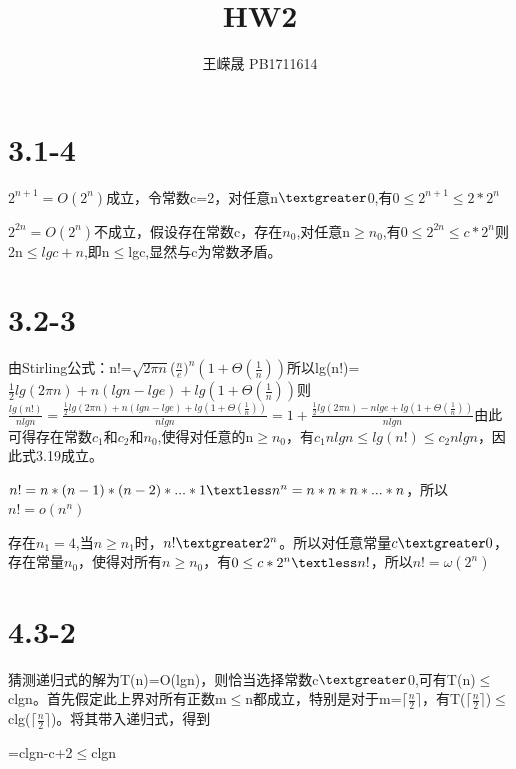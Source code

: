 \documentclass[UTF8]{ctexart}
\title{HW2}
\author{王嵘晟 \quad PB1711614}
\date{}
\begin{document}
	\maketitle
	\section*{3.1-4}
	\par{$2^{n+1}=O(2^{n})$成立，令常数c=2，对任意n$\textgreater$0,有$0\leq2^{n+1}\leq2*2^{n}$}  
	\par{$2^{2n}=O(2^{n})$不成立，假设存在常数c，存在$n_{0}$,对任意n$\ge$$n_{0}$,有$0\leq2^{2n}\leq$$c*2^{n}$则2n$\le$$lgc+n$,即n$\le$lgc,显然与c为常数矛盾。}
	\section*{3.2-3}
	\par{由Stirling公式：n!=$\sqrt{2\pi n}$($\frac{n}{e})^{n}$$(1+\Theta(\frac{1}{n}))$所以lg(n!)=$\frac{1}{2}lg(2\pi n)+n(lgn-lge)+lg(1+\Theta(\frac{1}{n}))$则$\frac{lg(n!)}{nlgn}=\frac{\frac{1}{2}lg(2\pi n)+n(lgn-lge)+lg(1+\Theta(\frac{1}{n}))}{nlgn}=1+\frac{\frac{1}{2}lg(2\pi n)-nlge+lg(1+\Theta(\frac{1}{n}))}{nlgn}$由此可得存在常数$c_{1}$和$c_{2}$和$n_{0}$,使得对任意的n$\ge$$n_{0}$，有$c_{1}nlgn\le lg(n!)\le c_{2}nlgn$，因此式3.19成立。}
	\par{$n!=n*(n-1)*(n-2)*...*1\textless n^{n}=n*n*n*...*n$，所以$n!=o(n^{n})$}
	\par{存在$n_{1}=4$,当$n\ge n_{1}$时，$n!\textgreater 2^{n}$。所以对任意常量$c\textgreater0$，存在常量$n_{0}$，使得对所有$n\ge n_{0}$，有$0\le c*2^{n}\textless n!$，所以$n!=\omega(2^{n})$}
	\section*{4.3-2}
	\par{猜测递归式的解为T(n)=O(lgn)，则恰当选择常数c$\textgreater$0,可有T(n)$\le$clgn。首先假定此上界对所有正数m$\le$n都成立，特别是对于m=$\lceil$$\frac{n}{2}$$\rceil$，有T($\lceil$$\frac{n}{2}$$\rceil$)$\le$clg($\lceil$$\frac{n}{2}$$\rceil$)。将其带入递归式，得到}
	\par{}
	\par{=clgn-c+2$\le$clgn}
	\par{}
\end{document}
